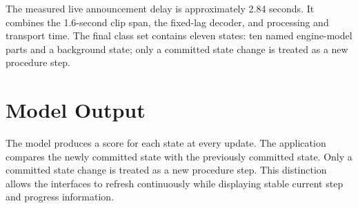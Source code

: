 The measured live announcement delay is approximately 2.84 seconds. It
combines the 1.6-second clip span, the fixed-lag decoder, and processing and
transport time. The final class set contains eleven states: ten named
engine-model parts and a background state; only a committed state change is
treated as a new procedure step.

\section{Model Output}

The model produces a score for each state at every update. The application
compares the newly committed state with the previously committed state. Only a
committed state change is treated as a new procedure step. This distinction
allows the interfaces to refresh continuously while displaying stable current
step and progress information.

